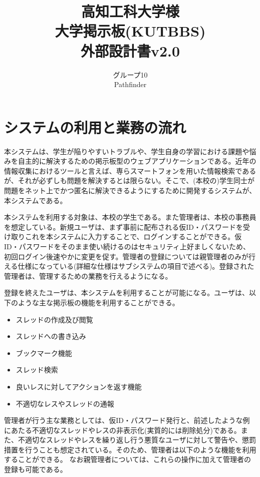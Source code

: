 \documentclass[a4j]{jarticle}
\title{
\vspace{30mm}
{\bf 高知工科大学様}
\\
\vspace{5mm}
大学掲示板(KUTBBS)\\
\vspace{5mm}
{\bf  外部設計書v2.0}
\vspace{90mm}
}
\author{
\vspace{5mm}
グループ10 \\
\vspace{5mm}
Pathfinder \\
\vspace{5mm}
\vspace{10mm}
}
\begin{document}
\maketitle
\tableofcontents
\newpage




\section{システムの利用と業務の流れ}
本システムは、学生が陥りやすいトラブルや、学生自身の学習における課題や悩みを自主的に解決するための掲示板型のウェブアプリケーションである。近年の情報収集におけるツールと言えば、専らスマートフォンを用いた情報検索であるが、それが必ずしも問題を解決するとは限らない。そこで、(本校の)学生同士が問題をネット上でかつ匿名に解決できるようにするために開発するシステムが、本システムである。



本システムを利用する対象は、本校の学生である。また管理者は、本校の事務員を想定している。新規ユーザは、まず事前に配布される仮ID・パスワードを受け取りこれを本システムに入力することで、ログインすることができる。仮ID・パスワードをそのまま使い続けるのはセキュリティ上好ましくないため、初回ログイン後速やかに変更を促す。管理者の登録については親管理者のみが行える仕様になっている(詳細な仕様はサブシステムの項目で述べる)。登録された管理者は、管理するための業務を行えるようになる。


登録を終えたユーザは、本システムを利用することが可能になる。ユーザは、以下のような主な掲示板の機能を利用することができる。
\begin{itemize}
  \item スレッドの作成及び閲覧
  \item スレッドへの書き込み
  \item ブックマーク機能
  \item スレッド検索
  \item 良いレスに対してアクションを返す機能
  \item 不適切なレスやスレッドの通報
\end{itemize}



管理者が行う主な業務としては、仮ID・パスワード発行と、前述したような例にあたる不適切なスレッドやレスの非表示化(実質的には削除処分)である。また、不適切なスレッドやレスを繰り返し行う悪質なユーザに対して警告や、懲罰措置を行うことも想定されている。そのため、管理者は以下のような機能を利用することができる。
なお親管理者については、これらの操作に加えて管理者の登録も可能である。
\end{document}
